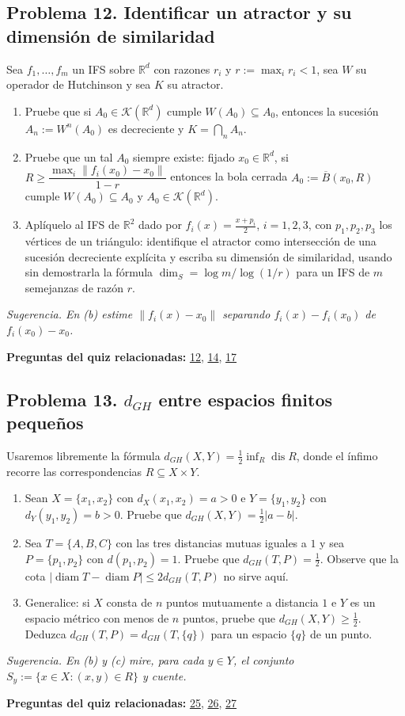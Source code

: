 \documentclass[11pt,a4paper]{article}
\providecommand{\lt}{<}\providecommand{\gt}{>}
\begin{document}
\subsection*{\hypertarget{prob-12}{}Problema 12. Identificar un atractor y su dimensión de similaridad}
Sea $f_1,\dots,f_m$ un IFS sobre $\mathbb{R}^{d}$ con razones $r_i$ y $r:=\max_ir_i\lt 1$, sea $W$ su operador de Hutchinson y sea $K$ su atractor.
\begin{enumerate}[label=(\alph*),leftmargin=2.2em,itemsep=2pt]
\item[(a)] Pruebe que si $A_0\in\mathcal K(\mathbb{R}^{d})$ cumple $W(A_0)\subseteq A_0$, entonces la sucesión $A_n:=W^{n}(A_0)$ es decreciente y $K=\bigcap_{n}A_n$.
\item[(b)] Pruebe que un tal $A_0$ siempre existe: fijado $x_0\in\mathbb{R}^d$, si $R\ge\dfrac{\max_i\|f_i(x_0)-x_0\|}{1-r}$ entonces la bola cerrada $A_0:=\overline{B}(x_0,R)$ cumple $W(A_0)\subseteq A_0$ y $A_0\in\mathcal K(\mathbb{R}^{d})$.
\item[(c)] Aplíquelo al IFS de $\mathbb{R}^{2}$ dado por $f_i(x)=\frac{x+p_i}2$, $i=1,2,3$, con $p_1,p_2,p_3$ los vértices de un triángulo: identifique el atractor como intersección de una sucesión decreciente explícita y escriba su dimensión de similaridad, usando sin demostrarla la fórmula $\dim_{S}=\log m/\log(1/r)$ para un IFS de $m$ semejanzas de razón $r$.
\end{enumerate}
{\small\itshape Sugerencia. En (b) estime $\|f_i(x)-x_0\|$ separando $f_i(x)-f_i(x_0)$ de $f_i(x_0)-x_0$.}
\par{\small\textbf{Preguntas del quiz relacionadas:} \hyperlink{r-12}{12}, \hyperlink{r-14}{14}, \hyperlink{r-17}{17}}
\subsection*{\hypertarget{prob-13}{}Problema 13. $d_{GH}$ entre espacios finitos pequeños}
Usaremos libremente la fórmula $d_{GH}(X,Y)=\frac12\inf_R\operatorname{dis} R$, donde el ínfimo recorre las correspondencias $R\subseteq X\times Y$.
\begin{enumerate}[label=(\alph*),leftmargin=2.2em,itemsep=2pt]
\item[(a)] Sean $X=\{x_1,x_2\}$ con $d_X(x_1,x_2)=a\gt 0$ e $Y=\{y_1,y_2\}$ con $d_Y(y_1,y_2)=b\gt 0$. Pruebe que $d_{GH}(X,Y)=\frac12|a-b|$.
\item[(b)] Sea $T=\{A,B,C\}$ con las tres distancias mutuas iguales a $1$ y sea $P=\{p_1,p_2\}$ con $d(p_1,p_2)=1$. Pruebe que $d_{GH}(T,P)=\frac12$. Observe que la cota $\left|\operatorname{diam} T-\operatorname{diam} P\right|\le2 d_{GH}(T,P)$ no sirve aquí.
\item[(c)] Generalice: si $X$ consta de $n$ puntos mutuamente a distancia $1$ e $Y$ es un espacio métrico con menos de $n$ puntos, pruebe que $d_{GH}(X,Y)\ge\frac12$. Deduzca $d_{GH}(T,P)=d_{GH}(T,\{q\})$ para un espacio $\{q\}$ de un punto.
\end{enumerate}
{\small\itshape Sugerencia. En (b) y (c) mire, para cada $y\in Y$, el conjunto $S_y:=\{x\in X:(x,y)\in R\}$ y cuente.}
\par{\small\textbf{Preguntas del quiz relacionadas:} \hyperlink{r-25}{25}, \hyperlink{r-26}{26}, \hyperlink{r-27}{27}}
\end{document}
